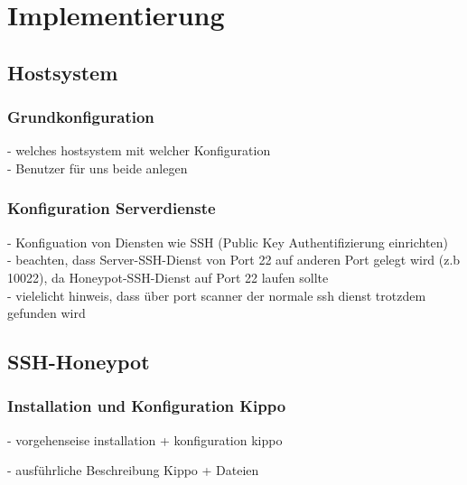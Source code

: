 \chapter{Implementierung}
\label{ch:Implementierung}


\section{Hostsystem}
\label{sec:Hostsystem}

\subsection{Grundkonfiguration}
\label{subsec:Grundkonfiguration}

- welches hostsystem mit welcher Konfiguration\\
- Benutzer für uns beide anlegen\\

\subsection{Konfiguration Serverdienste}
\label{subsec:Konfiguration Serverdienste}

- Konfiguation von Diensten wie SSH (Public Key Authentifizierung einrichten)\\
- beachten, dass Server-SSH-Dienst von Port 22 auf anderen Port gelegt wird (z.b 10022), da Honeypot-SSH-Dienst auf Port 22 laufen sollte\\
- vielelicht hinweis, dass über port scanner der normale ssh dienst trotzdem gefunden wird\\

\section{SSH-Honeypot}
\label{sec:SSH-Honeypot}

\subsection{Installation und Konfiguration Kippo}
\label{subsec:Installation und Konfiguration Kippo}

- vorgehenseise installation + konfiguration kippo

- ausführliche Beschreibung Kippo + Dateien\\


